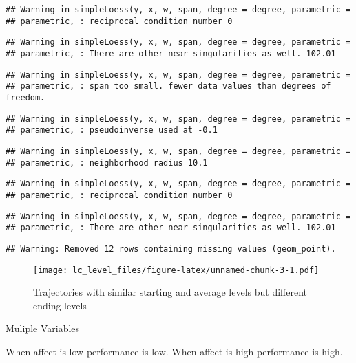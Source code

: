 \documentclass[]{article}
\begin{document}
\begin{verbatim}
## Warning in simpleLoess(y, x, w, span, degree = degree, parametric =
## parametric, : reciprocal condition number 0
\end{verbatim}

\begin{verbatim}
## Warning in simpleLoess(y, x, w, span, degree = degree, parametric =
## parametric, : There are other near singularities as well. 102.01
\end{verbatim}

\begin{verbatim}
## Warning in simpleLoess(y, x, w, span, degree = degree, parametric =
## parametric, : span too small. fewer data values than degrees of freedom.
\end{verbatim}

\begin{verbatim}
## Warning in simpleLoess(y, x, w, span, degree = degree, parametric =
## parametric, : pseudoinverse used at -0.1
\end{verbatim}

\begin{verbatim}
## Warning in simpleLoess(y, x, w, span, degree = degree, parametric =
## parametric, : neighborhood radius 10.1
\end{verbatim}

\begin{verbatim}
## Warning in simpleLoess(y, x, w, span, degree = degree, parametric =
## parametric, : reciprocal condition number 0
\end{verbatim}

\begin{verbatim}
## Warning in simpleLoess(y, x, w, span, degree = degree, parametric =
## parametric, : There are other near singularities as well. 102.01
\end{verbatim}

\begin{verbatim}
## Warning: Removed 12 rows containing missing values (geom_point).
\end{verbatim}

\begin{figure}
\centering
\texttt{[image: lc\_level\_files/figure-latex/unnamed-chunk-3-1.pdf]}
\caption{Trajectories with similar starting and average levels but
different ending levels\label{level_var}}
\end{figure}

Muliple Variables

When affect is low performance is low. When affect is high performance
is high.
\end{document}
